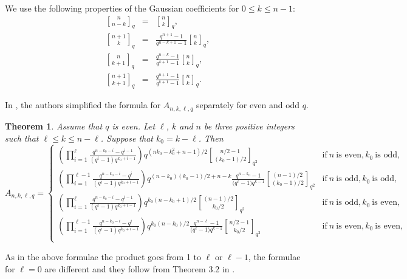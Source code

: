 \documentclass[a4paper,11pt]{article}
\newtheorem{theorem}{Theorem}
\begin{document}
We use the following properties of the Gaussian coefficients for $0\le k\le n-1$:
\begin{eqnarray}
{n\brack n-k}_q &=& {n\brack k}_q, \\
  {n+1\brack k}_q &=& \frac{q^{n+1}-1}{q^{n-k+1}-1}{n\brack k}_q,\\
  {n\brack k+1}_q &=& \frac{q^{n-k}-1}{q^{k+1}-1}{n\brack k}_q, \\
  {n+1\brack k+1}_q&=&\frac{q^{n+1}-1}{q^{k+1}-1}{n\brack k}_q.
\end{eqnarray}

In \cite{LiShiLing}, the authors simplified the formula for $A_{n,k,\ell,q}$ separately for even and odd $q$.

\begin{theorem}\cite[Theorem 3.4]{LiShiLing} \label{theorem.Li et al.even} Assume that $q$ is even. Let $\ell$, $k$ and $n$ be three positive integers such that $\ell\le k\le n-\ell$. Suppose that $k_0=k-\ell$. Then
\begin{equation}\label{evenq}
A_{n,k,\ell,q}=\left\{\begin{array}{ll}
\left(\prod_{i=1}^\ell\frac{q^{n-k_0-i}-q^{i-1}}{(q^i-1)q^{k_0+i-1}}\right)q^{(nk_0-k_0^2+n-1)/2}{n/2-1\brack(k_0-1)/2 }_{q^2}&\mbox{if} \ n \ \mbox{is even}, k_0 \ \mbox{is odd},\\
\left(\prod_{i=1}^{\ell-1}\frac{q^{n-k_0-i}-q^{i}}{(q^i-1)q^{k_0+i-1}}\right)q^{(n-k_0)(k_0-1)/2+n-k}\frac{q^{n-k_0}-1}{{(q^\ell}-1)q^{k-1}}{(n-1)/2\brack(k_0-1)/2 }_{q^2}&\mbox{if} \ n \ \mbox{is odd}, k_0 \ \mbox{is odd},\\
\left(\prod_{i=1}^\ell\frac{q^{n-k_0-i}-q^{i-1}}{(q^i-1)q^{k_0+i-1}}\right)q^{k_0(n-k_0+1)/2}{(n-1)/2\brack k_0/2 }_{q^2}&\mbox{if} \ n \ \mbox{is odd}, k_0 \ \mbox{is even},\\
\left(\prod_{i=1}^{\ell-1}\frac{q^{n-k_0-i}-q^{i}}{(q^i-1)q^{k_0+i-1}}\right)q^{k_0(n-k_0)/2}\frac{q^{n-\ell}-1}{{(q^\ell}-1)q^{k-1}}{n/2-1\brack k_0/2 }_{q^2}&\mbox{if} \ n \ \mbox{is even}, k_0 \ \mbox{is even},\\
\end{array}\right.
\end{equation}
\end{theorem}

As in the above formulae the product goes from 1 to $\ell$ or $\ell-1$, the formulae for $\ell=0$ are different and they follow from Theorem 3.2 in \cite{LiShiLing}.
\end{document}
